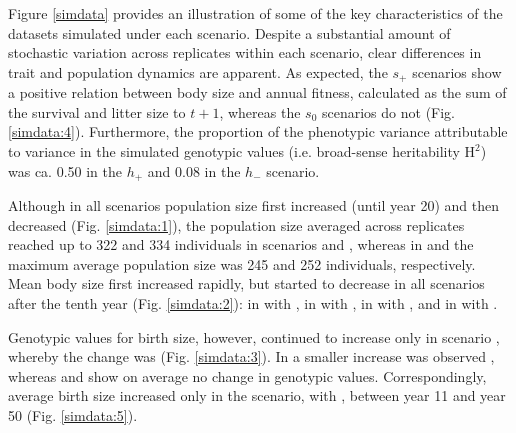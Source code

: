 Figure \ref{simdata} provides an illustration of some of the key characteristics of the datasets simulated under each scenario. Despite a substantial amount of stochastic variation across replicates within each scenario, clear differences in trait and population dynamics are apparent. As expected, the $s_+$ scenarios show a positive relation between body size and annual fitness, calculated as the sum of the survival and litter size to $t+1$, whereas the $s_0$ scenarios do not (Fig. \ref{simdata:4}). Furthermore, the proportion of the phenotypic variance attributable to variance in the simulated genotypic values (i.e. broad-sense heritability $\text{H}^2$) was ca. 0.50 in the $h_+$ and 0.08 in the $h_-$ scenario.

Although in all scenarios population size first increased (until year 20) and then decreased (Fig. \ref{simdata:1}), the  population size averaged across replicates reached up to 322 and 334 individuals in scenarios \Sh and \SH, whereas in \sh and \sH the maximum average population size was 245 and 252 individuals, respectively. Mean body size first increased rapidly, but started to decrease in all scenarios after the tenth year (Fig. \ref{simdata:2}): in \sh with , in \sH with , in \Sh with , and in \SH with .

Genotypic values for birth size, however, continued to increase only in scenario \SH, whereby the change was  (Fig. \ref{simdata:3}). In \Sh a smaller increase was observed , whereas \sh and \sH show on average no change in genotypic values. Correspondingly, average birth size increased only in the \SH scenario, with , between year 11 and year 50 (Fig. \ref{simdata:5}). 



\printbibliography[heading=subbibliography]
